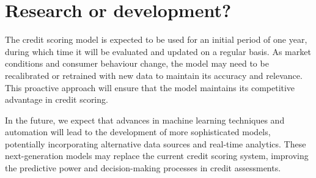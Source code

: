 \documentclass[12pt]{article}
\begin{document}
\section{Research or development?}
The credit scoring model is expected to be used for an initial period of one year, during which time it will be evaluated and updated on a regular basis. As market conditions and consumer behaviour change, the model may need to be recalibrated or retrained with new data to maintain its accuracy and relevance. This proactive approach will ensure that the model maintains its competitive advantage in credit scoring.

In the future, we expect that advances in machine learning techniques and automation will lead to the development of more sophisticated models, potentially incorporating alternative data sources and real-time analytics. These next-generation models may replace the current credit scoring system, improving the predictive power and decision-making processes in credit assessments.

%
%
\end{document}
